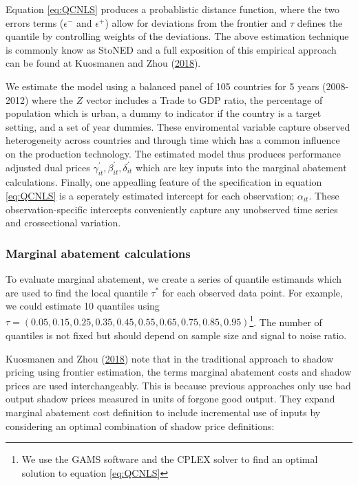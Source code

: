 \documentclass[
  12pt,
]{article}
\begin{document}
Equation \eqref{eq:QCNLS} produces a probablistic distance function, where the two errors terms (\(\epsilon^-\) and \(\epsilon^+\)) allow for deviations from the frontier and \(\tau\) defines the quantile by controlling weights of the deviations. The above estimation technique is commonly know as StoNED and a full exposition of this empirical approach can be found at Kuosmanen and Zhou (\protect\hyperlink{ref-Kuosmanen2018b}{2018}).

We estimate the model using a balanced panel of 105 countries for 5 years (2008-2012) where the \(Z\) vector includes a Trade to GDP ratio, the percentage of population which is urban, a dummy to indicator if the country is a target setting, and a set of year dummies. These enviromental variable capture observed heterogeneity across countries and through time which has a common influence on the production technology. The estimated model thus produces performance adjusted dual prices \(\gamma^{'}_{it},\beta^{'}_{it} ,\delta^{'}_{it}\) which are key inputs into the marginal abatement calculations. Finally, one appealling feature of the specification in equation \eqref{eq:QCNLS} is a seperately estimated intercept for each observation; \(\alpha_{it}\). These observation-specific intercepts conveniently capture any unobserved time series and crossectional variation.

\hypertarget{marginal-abatement-calculations}{%
\subsubsection{Marginal abatement calculations}\label{marginal-abatement-calculations}}

To evaluate marginal abatement, we create a series of quantile estimands which are used to find the local quantile \(\tau^{*}\) for each observed data point. For example, we could estimate 10 quantiles using \(\tau=(0.05,0.15,0.25,0.35,0.45,0.55,0.65,0.75,0.85,0.95)\)\footnote{We use the GAMS software and the CPLEX solver to find an optimal solution to equation \eqref{eq:QCNLS}}. The number of quantiles is not fixed but should depend on sample size and signal to noise ratio.

Kuosmanen and Zhou (\protect\hyperlink{ref-Kuosmanen2018b}{2018}) note that in the traditional approach to shadow pricing using frontier estimation, the terms marginal abatement costs and shadow prices are used interchangeably. This is because previous approaches only use bad output shadow prices measured in units of forgone good output. They expand marginal abatement cost definition to include incremental use of inputs by considering an optimal combination of shadow price definitions:
\end{document}
